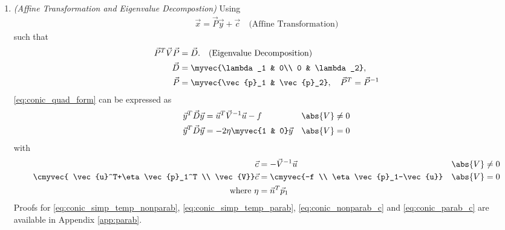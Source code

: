 \renewcommand{\theequation}{\theenumi}
\begin{enumerate}[label=\thesection.\arabic*.,ref=\thesection.\theenumi]

\item {\em (Affine Transformation and Eigenvalue Decompostion)}
Using 
\begin{align}
\vec{x} = \vec{P}\vec{y}+\vec{c} \quad \text{(Affine Transformation)}
\label{eq:conic_affine}
\end{align}
such that 
\begin{align}
\label{eq:conic_parmas_eig_def}
\vec{P}^T\vec{V}\vec{P} &= \vec{D}. \quad \text{(Eigenvalue Decomposition)}
\\
\vec{D} &= \myvec{\lambda_1 & 0\\ 0 & \lambda_2}, 
\\
\vec{P} &= \myvec{\vec{p}_1 & \vec{p}_2}, \quad \vec{P}^T=\vec{P}^{-1}
\end{align}
\eqref{eq:conic_quad_form} can be expressed as
\begin{align}
\label{eq:conic_simp_temp_nonparab}
\vec{y}^T\vec{D}\vec{y} &=  \vec{u}^T\vec{V}^{-1}\vec{u} -f  &  \abs{V} &\ne 0
\\
\vec{y}^T\vec{D}\vec{y} &=  -2\eta\myvec{1 & 0}\vec{y}   & \abs{V} &= 0
\label{eq:conic_simp_temp_parab}
\end{align}
with 
\begin{align}
\label{eq:conic_nonparab_c}
\vec{c} &= - \vec{V}^{-1}\vec{u} & \abs{V} &\ne 0
\\
\cmyvec{ \vec{u}^T+\eta\vec{p}_1^T \\ \vec{V}}\vec{c} &= \cmyvec{-f \\ \eta\vec{p}_1-\vec{u}}  &\abs{V} &= 0
\label{eq:conic_parab_c}
\\
\text{where } \eta &=\vec{n}^T\vec{p}_1
\end{align}
\solution
%
 Proofs for \eqref{eq:conic_simp_temp_nonparab},
\eqref{eq:conic_simp_temp_parab}, \eqref{eq:conic_nonparab_c}
 and \eqref{eq:conic_parab_c}
are available in Appendix \ref{app:parab}.

\end{enumerate}
